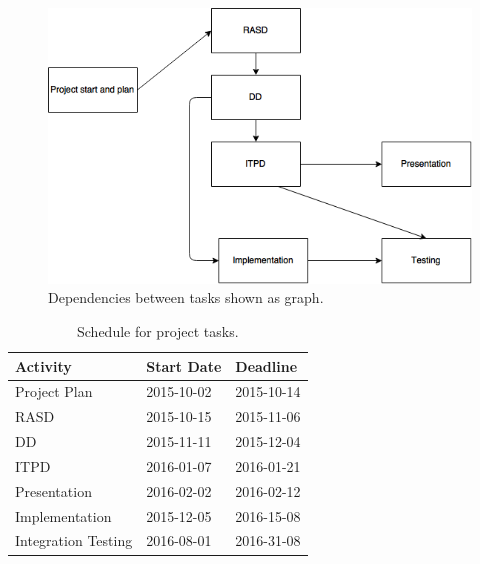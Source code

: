 \begin{figure}
    \centering
    \includegraphics[width=\textwidth]{img/tasks-dep-graph.jpg}
    \caption{Dependencies between tasks shown as graph.}
    \label{fig:tasks-dep-graph}
\end{figure}

\begin{table}[p]
    \centering
    \begin{tabular}{| l | l | l |}
        \hline
        \textbf{Activity}   & \textbf{Start Date}   & \textbf{Deadline} \\
        \hline
        Project Plan        & 2015-10-02            & 2015-10-14        \\
        RASD                & 2015-10-15            & 2015-11-06        \\
        DD                  & 2015-11-11            & 2015-12-04        \\
        ITPD                & 2016-01-07            & 2016-01-21        \\
        Presentation        & 2016-02-02            & 2016-02-12        \\
        Implementation      & 2015-12-05            & 2016-15-08        \\
        Integration Testing & 2016-08-01            & 2016-31-08        \\
        \hline
    \end{tabular}
    \caption{Schedule for project tasks.}
    \label{tab:schedule}
\end{table}

